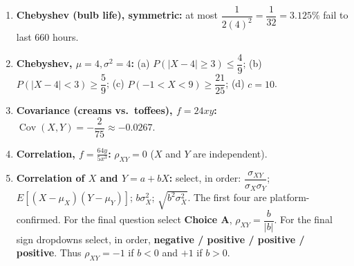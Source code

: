 \documentclass[11pt]{article}
\begin{document}
\begin{enumerate}[leftmargin=*,label=\textbf{\arabic*.}]
\item \textbf{Chebyshev (bulb life), symmetric:}
at most $\dfrac{1}{2(4)^2}=\dfrac{1}{32}=3.125\%$ fail to last 660 hours.

\item \textbf{Chebyshev, $\mu=4,\sigma^2=4$:}
(a) $P(|X-4|\ge 3)\le \dfrac{4}{9}$;\quad
(b) $P(|X-4|<3)\ge\dfrac59$;\quad
(c) $P(-1<X<9)\ge\dfrac{21}{25}$;\quad
(d) $c=10$.

\item \textbf{Covariance (creams vs.\ toffees), $f=24xy$:}
$\operatorname{Cov}(X,Y)=-\dfrac{2}{75}\approx-0.0267$.

\item \textbf{Correlation, $f=\tfrac{64y}{5x^3}$:}
$\rho_{XY}=0$ ($X$ and $Y$ are independent).

\item \textbf{Correlation of $X$ and $Y=a+bX$:}
select, in order:
$\dfrac{\sigma_{XY}}{\sigma_X\sigma_Y}$;
$E[(X-\mu_X)(Y-\mu_Y)]$;
$b\sigma_X^2$;
$\boxed{\sqrt{b^2\sigma_X^2}}$.
The first four are platform-confirmed. For the final question select
\textbf{Choice A},
$\rho_{XY}=\dfrac{b}{|b|}$.
For the final sign dropdowns select, in order,
\textbf{negative / positive / positive / positive}.
Thus $\rho_{XY}=-1$ if $b<0$ and $+1$ if $b>0$.
\end{enumerate}
\end{document}
